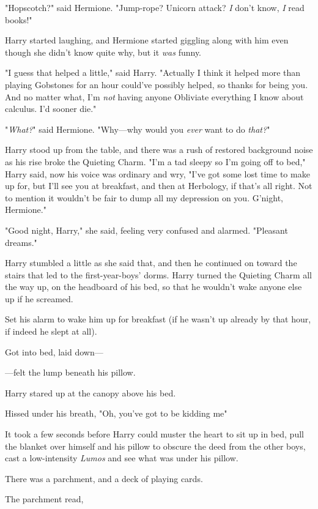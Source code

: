 "Hopscotch?" said Hermione. "Jump-rope? Unicorn attack? \emph{I} don't know,
\emph{I} read books!"

Harry started laughing, and Hermione started giggling along with him even
though she didn't know quite why, but it \emph{was} funny.

"I guess that helped a little," said Harry. "Actually I think it helped more
than playing Gobstones for an hour could've possibly helped, so thanks for
being you. And no matter what, I'm \emph{not} having anyone Obliviate
everything I know about calculus. I'd sooner die."

"\emph{What?}" said Hermione. "Why---why would you \emph{ever} want to do
\emph{that?}"

Harry stood up from the table, and there was a rush of restored background
noise as his rise broke the Quieting Charm. "I'm a tad sleepy so I'm going off
to bed," Harry said, now his voice was ordinary and wry, "I've got some lost
time to make up for, but I'll see you at breakfast, and then at Herbology, if
that's all right. Not to mention it wouldn't be fair to dump all my depression
on you. G'night, Hermione."

"Good night, Harry," she said, feeling very confused and alarmed. "Pleasant
dreams."

Harry stumbled a little as she said that, and then he continued on toward the
stairs that led to the first-year-boys' dorms.
\sbreak
Harry turned the Quieting Charm all the way up, on the headboard of his bed, so
that he wouldn't wake anyone else up if he screamed.

Set his alarm to wake him up for breakfast (if he wasn't up already by that
hour, if indeed he slept at all).

Got into bed, laid down---

---felt the lump beneath his pillow.

Harry stared up at the canopy above his bed.

Hissed under his breath, "Oh, you've got to be kidding me{\el}"

It took a few seconds before Harry could muster the heart to sit up in bed,
pull the blanket over himself and his pillow to obscure the deed from the other
boys, cast a low-intensity \emph{Lumos} and see what was under his pillow.

There was a parchment, and a deck of playing cards.

The parchment read,

